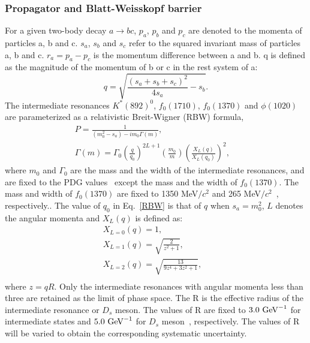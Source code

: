 \documentclass[aps,prd,twocolumn,showpacs,amsmath,amssymb]{revtex4-1}
\begin{document}
\subsubsection{Propagator and Blatt-Weisskopf barrier}
\label{propagator}
For a given two-body decay $a \rightarrow bc$,  $p_{a}$, $p_{b}$ and $p_{c}$ are denoted to the momenta of particles a, b and c.
$s_{a}$, $s_{b}$ and $s_{c}$ refer to the squared invariant mass of particles a, b and c.
$r_{a} = p_{a} - p_{c}$ is the momentum difference between a and b.
q is defined as the magnitude of the momentum of b or c in the rest system of a:
\begin{equation}
    q=\sqrt{ \frac{(s_{a} + s_{b} + s_{c})^{2}}{4s_{a}} - s_{b}}. \label{base-q}
\end{equation}
The intermediate resonances $K^{*}(892)^{0}$, $f_{0}(1710)$, $f_{0}(1370)$ and $\phi(1020)$ are parameterized as a relativistic Breit-Wigner (RBW) formula,
\begin{equation}
    \begin{array}{lr}
        P = \frac{1}{(m_{0}^{2} - s_{a} ) - im_{0}\Gamma(m)}, &\\
        \Gamma(m) = \Gamma_{0}\left(\frac{q}{q_{0}}\right)^{2L+1}\left(\frac{m_{0}}{m}\right)\left(\frac{X_{L}(q)}{X_{L}(q_{0})}\right)^{2}, &
    \end{array}\label{RBW} 
\end{equation}
where $m_{0}$ and $\Gamma_{0}$ are the mass and the width of the intermediate resonances, and are fixed to the PDG values~\cite{PDG} except the mass and the width of $f_{0}(1370)$. 
The mass and width of $f_{0}(1370)$ are fixed to 1350 MeV$/c^{2}$ and 265 MeV$/c^{2}$~\cite{para-f01370}, respectively..
The value of $q_{0}$ in Eq.~\ref{RBW} is that of $q$ when $s_{a}=m_{0}^{2}$, $L$ denotes the angular momenta and $X_{L}(q)$ is defined as:
\begin{equation}
    \begin{array}{lr}
        X_{L=0}(q) = 1,       &\\
        X_{L=1}(q) = \sqrt{\frac{2}{z^{2}+1}},       &\\
        X_{L=2}(q) = \sqrt{\frac{13}{9z^{4}+3z^{2}+1}},       &\\
    \end{array}\label{XLQ} 
\end{equation}
where $z=qR$.
Only the intermediate resonances with angular momenta less than three are retained as the limit of phase space. 
The R is the effective radius of the intermediate resonance or $D_{s}$ meson.
The values of R are fixed to $3.0\ {\rm GeV}^{-1}$ for intermediate states and $5.0\ {\rm GeV}^{-1}$  for $D_{s}$ meson~\cite{Doc-DB-416-v30}, respectively.
The values of R will be varied to obtain the corresponding systematic uncertainty.
\end{document}
